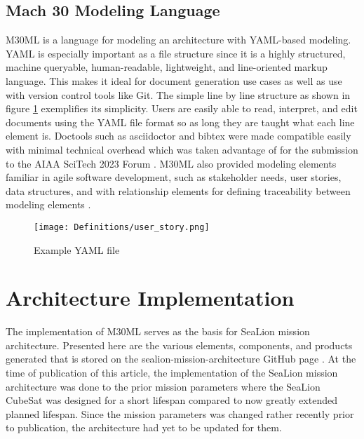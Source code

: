 \documentclass[journal,article,submit,pdftex,moreauthors]{Definitions/mdpi}
\begin{document}
\subsection{Mach 30 Modeling Language}

M30ML is a language for modeling an architecture with YAML-based modeling.  YAML is especially important as a file structure since it is a highly structured, machine queryable, human-readable, lightweight, and line-oriented markup language.  This makes it ideal for document generation use cases as well as use with version control tools like Git.  The simple line by line structure as shown in figure \ref{fig:example_yaml} exemplifies its simplicity.  Users are easily able to read, interpret, and edit documents using the YAML file format so as long they are taught what each line element is.  Doctools such as asciidoctor and bibtex were made compatible easily with minimal technical overhead which was taken advantage of for the submission to the AIAA SciTech 2023 Forum \cite{scitech_proceeding}.  M30ML also provided modeling elements familiar in agile software development, such as stakeholder needs, user stories, data structures, and with relationship elements for defining traceability between modeling elements \cite{mach30_git}.

\begin{figure}[H]
    \texttt{[image: Definitions/user\_story.png]}
    \caption{Example YAML file}
	\label{fig:example_yaml}
    \end{figure}   
\unskip

\section{Architecture Implementation}
The implementation of M30ML serves as the basis for SeaLion mission architecture.  Presented here are the various elements, components, and products generated that is stored on the sealion-mission-architecture GitHub page \cite{sealion_mission_architecture}.  At the time of publication of this article, the implementation of the SeaLion mission architecture was done to the prior mission parameters where the SeaLion CubeSat was designed for a short lifespan compared to now greatly extended planned lifespan.  Since the mission parameters was changed rather recently prior to publication, the architecture had yet to be updated for them.
\end{document}
